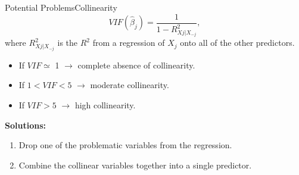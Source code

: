 \begin{frame}{Potential Problems}{Collinearity}
    $$ VIF(\hat{\beta}_j) = \frac{1}{1- R^2_{Xj|X_{-j}}}, $$
    where $R^2_{Xj|X_{-j}}$ is the $R^2$ from a regression of $X_j$ onto all of the other predictors. \pause

    \begin{itemize}
        \item If $VIF \simeq$ 1 $\rightarrow$  complete absence of collinearity. \pause
        \item If $1 < VIF < 5$ $\rightarrow$  moderate collinearity. \pause
        \item If $VIF > 5$ $\rightarrow$  high collinearity. \pause
    \end{itemize}

\textbf{Solutions:} \pause
    \begin{enumerate}
        \item Drop one of the problematic variables from the regression. \pause 
        \item Combine the collinear variables together into a single predictor. 
    \end{enumerate}

    
\end{frame}


    
